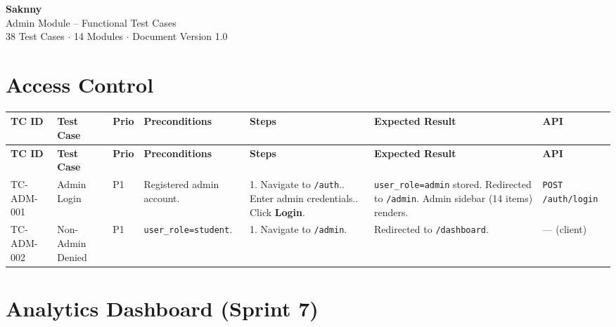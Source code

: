 \documentclass[12pt,a4paper]{article}
\begin{document}
\begin{titlepage}
    \centering
    \vspace*{4cm}
    {\Huge\bfseries\textcolor{saknnyprimary}{Saknny}}\\[0.5cm]
    {\Large\textcolor{saknnyaccent}{Admin Module -- Functional Test Cases}}\\[1.5cm]
    \vfill
    {\small 38 Test Cases $\cdot$ 14 Modules $\cdot$ Document Version 1.0}
\end{titlepage}

\tableofcontents
\newpage

\section{Access Control}

\begin{longtable}{L{2cm} L{3cm} L{1cm} L{4cm} L{5.5cm} L{5.5cm} L{3cm}}
\toprule
\textbf{TC ID} & \textbf{Test Case} & \textbf{Prio} & \textbf{Preconditions} & \textbf{Steps} & \textbf{Expected Result} & \textbf{API} \\
\midrule
\endfirsthead \toprule \textbf{TC ID} & \textbf{Test Case} & \textbf{Prio} & \textbf{Preconditions} & \textbf{Steps} & \textbf{Expected Result} & \textbf{API} \\ \midrule \endhead \bottomrule \endfoot

TC-ADM-001 & Admin Login & P1 & Registered admin account. & 1. Navigate to \texttt{/auth}.. Enter admin credentials.. Click \textbf{Login}. & \texttt{user\_role=admin} stored. Redirected to \texttt{/admin}. Admin sidebar (14 items) renders. & \texttt{POST /auth/login} \\
\midrule
TC-ADM-002 & Non-Admin Denied & P1 & \texttt{user\_role=student}. & 1. Navigate to \texttt{/admin}. & Redirected to \texttt{/dashboard}. & --- (client) \\
\end{longtable}

\section{Analytics Dashboard (Sprint 7)}
\end{document}
